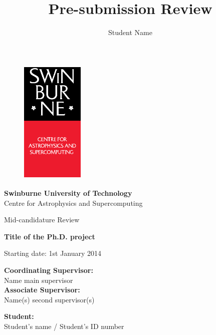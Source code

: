 \documentclass[useAMS,usenatbib,onecolumn]{mnras}
\title{Pre-submission Review}
\author[Student Name]
 {Student Name}
\begin{document}
\fontsize{11}{12.5}\selectfont
\begin{center}

\begin{figure}
\begin{center}
\includegraphics[height=6cm,width=3cm]{./astro_v.eps}
\end{center}
\end{figure}

{\bf \LARGE S\Large winburne \LARGE U\Large niversity of  \LARGE T\Large echnology\\
\vspace{0.5cm}}
\LARGE C\Large entre for \LARGE A\Large strophysics and \LARGE S\Large upercomputing\\
\vspace{0.5cm}

\large Mid-candidature Review\\
\vspace{0.5cm}



\Huge{\bf Title of the Ph.D. project}

\vspace{3cm}
\large{Starting date: 1st January 2014}
\end{center}


\begin{flushleft}
{\bf Coordinating Supervisor:}\\
Name main supervisor\\
\vspace{0.5cm}
{\bf Associate Supervisor:}\\
Name(s) second supervisor(s)\\
\end{flushleft}

\begin{flushright}
{\bf Student:}\\
Student's name / Student's ID number
\end{flushright}\hspace{8cm}
\end{document}
